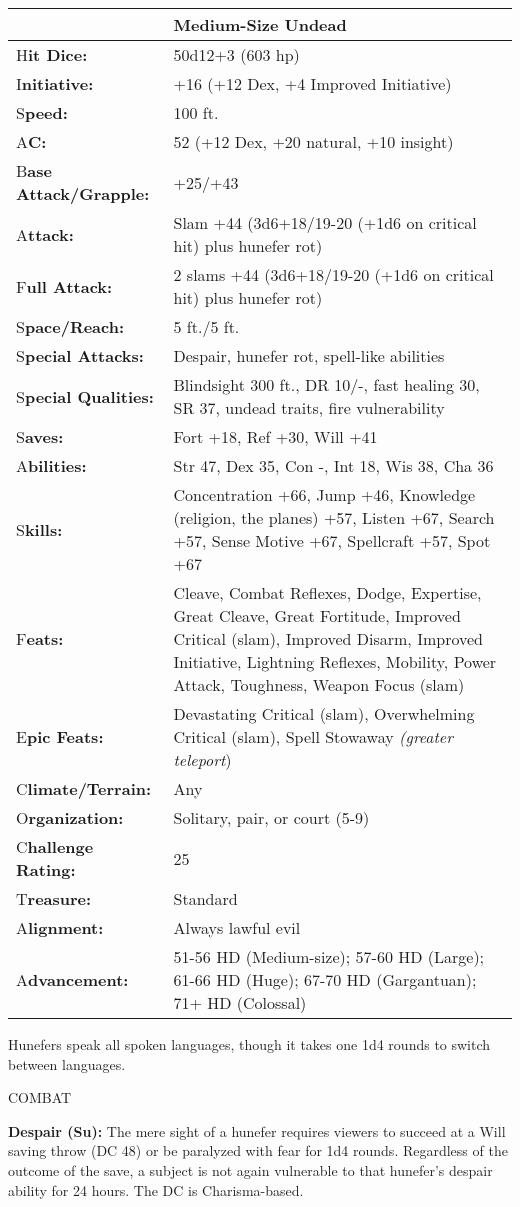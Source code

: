 \documentclass{article}
\begin{document}
{\begin{tabular}{|>{\raggedright}p{63pt}|>{\raggedright}p{262pt}|}
\hline
  & Medium-Size Undead \tabularnewline
\hline
H\textbf{it Dice:} & 50d12+3 (603 hp) \tabularnewline
\hline
I\textbf{nitiative:} & +16 (+12 Dex, +4 Improved Initiative)\tabularnewline
\hline
S\textbf{peed:} & 100 ft. \tabularnewline
\hline
A\textbf{C:} & 52 (+12 Dex, +20 natural, +10 insight) \tabularnewline
\hline
B\textbf{ase Attack/Grapple:} & +25/+43\tabularnewline
\hline
A\textbf{ttack:} & Slam +44 (3d6+18/19-20 (+1d6 on critical hit) plus hunefer rot)\tabularnewline
\hline
F\textbf{ull Attack:} & 2 slams +44 (3d6+18/19-20 (+1d6 on critical hit) plus hunefer 
rot)\tabularnewline
\hline
S\textbf{pace/Reach:} & 5 ft./5 ft. \tabularnewline
\hline
S\textbf{pecial Attacks:} & Despair, hunefer rot, spell-like abilities \tabularnewline
\hline
S\textbf{pecial Qualities:} & Blindsight 300 ft., DR 10/-, fast healing 30, SR 
37, undead traits, fire vulnerability \tabularnewline
\hline
S\textbf{aves:} & Fort +18, Ref +30, Will +41 \tabularnewline
\hline
A\textbf{bilities:} & Str 47, Dex 35, Con -, Int 18, Wis 38, Cha 36 \tabularnewline
\hline
S\textbf{kills:} & Concentration +66, Jump +46, Knowledge (religion, the planes) 
+57, Listen +67, Search +57, Sense Motive +67, Spellcraft +57, Spot +67\tabularnewline
\hline
F\textbf{eats:} & Cleave, Combat Reflexes, Dodge, Expertise, Great Cleave, Great 
Fortitude, Improved Critical (slam), Improved Disarm, Improved Initiative, Lightning 
Reflexes, Mobility, Power Attack, Toughness, Weapon Focus (slam) \tabularnewline
\hline
E\textbf{pic Feats:} & Devastating Critical (slam), Overwhelming Critical (slam), 
Spell Stowaway \textit{(greater teleport}) \tabularnewline
\hline
C\textbf{limate/Terrain:} & Any \tabularnewline
\hline
O\textbf{rganization:} & Solitary, pair, or court (5-9) \tabularnewline
\hline
C\textbf{hallenge Rating:} & 25 \tabularnewline
\hline
T\textbf{reasure:} & Standard \tabularnewline
\hline
A\textbf{lignment:} & Always lawful evil \tabularnewline
\hline
A\textbf{dvancement:} & 51-56 HD (Medium-size); 57-60 HD (Large); 61-66 HD (Huge); 
67-70 HD (Gargantuan); 71+ HD (Colossal) \tabularnewline
\hline
\end{tabular}

Hunefers speak all spoken languages, though it takes one 1d4 rounds to switch between 
languages. 

COMBAT 

\textbf{Despair (Su):} The mere sight of a hunefer requires viewers to succeed 
at a Will saving throw (DC 48) or be paralyzed with fear for 1d4 rounds. Regardless 
of the outcome of the save, a subject is not again vulnerable to that hunefer's 
despair ability for 24 hours. The DC is Charisma-based.

}
\end{document}
